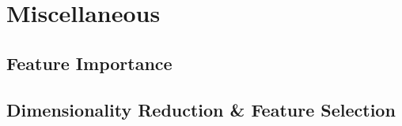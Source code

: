 \chapter{Miscellaneous}
\label{chap:misc}

\section{Feature Importance}
\label{misc:feature_importance}

\section{Dimensionality Reduction \& Feature Selection}
\label{misc:m_reduction}
